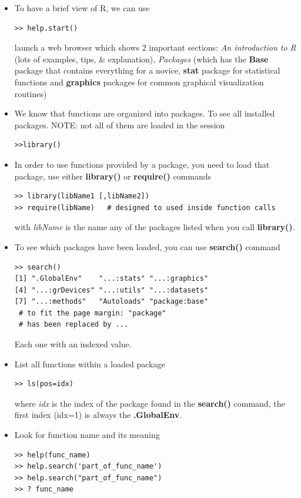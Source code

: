\begin{itemize}
\item To have a brief view of R, we can use
\begin{lstlisting}
>> help.start()
\end{lstlisting}
  launch a web browser which shows 2 important sections:
  {\it An introduction to R} (lots of examples, tips, \& explanation),
  {\it Packages} (which has the {\bf Base} package that contains
  everything for a novice, {\bf stat} package for statistical
  functions and {\bf graphics} packages for common graphical
  visualization routines)

\item We know that functions are organized into packages. To see all
  installed packages. NOTE: not all of them are loaded in the session
\begin{lstlisting}
>>library()	
\end{lstlisting}

\item In order to use functions provided by a package, you need to
  load that package, use either {\bf library()} or {\bf require()}
  commands
\begin{lstlisting}
>> library(libName1 [,libName2])
>> require(libName)   # designed to used inside function calls
\end{lstlisting}
  with {\it libName} is the name any of the packages listed when you call
  {\bf library()}.

\item To see which packages have been loaded, you can use
  {\bf search()} command
\begin{lstlisting}
>> search()   
[1] ".GlobalEnv"    "...:stats" "...:graphics" 
[4] "...:grDevices" "...:utils" "...:datasets" 
[7] "...:methods"   "Autoloads" "package:base"     
 # to fit the page margin: "package" 
 # has been replaced by ...
\end{lstlisting}
  Each one with an indexed value.  

\item List all functions within a loaded package
\begin{lstlisting}
>> ls(pos=idx) 
\end{lstlisting}
  where {\it idx} is the index of the package found in the
  {\bf search()} command, the first index (idx=1) is always the
  {\bf .GlobalEnv}.

\item Look for function name and its meaning
\begin{lstlisting}
>> help(func_name)
>> help.search('part_of_func_name')
>> help.search("part_of_func_name")
>> ? func_name
\end{lstlisting}


\end{itemize}
